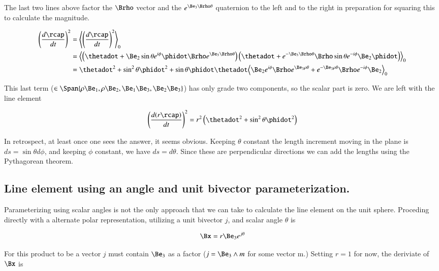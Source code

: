 The last two lines above factor the $\Brho$ vector and the $e^{\Be_3 \Brho \theta}$ quaternion to the left and to the right in preparation for squaring this to calculate the magnitude.

\begin{align*}
\left( \frac{d\rcap}{dt} \right)^2
&=
\gpgradezero{ \left( \frac{d\rcap}{dt} \right)^2 } \\
&=
\gpgradezero{ 
\left( \thetadot + \Be_2 \sin\theta e^{i\phi} \phidot \Brho e^{\Be_3 \Brho \theta} \right) 
\left(\thetadot + e^{-\Be_3 \Brho \theta} \Brho \sin\theta e^{-i\phi} \Be_2 \phidot\right) } \\
&=
\thetadot^2 + \sin^2\theta \phidot^2
+ \sin\theta \phidot \thetadot
\gpgradezero{ 
\Be_2 e^{i\phi} \Brho e^{\Be_3 \rho \theta}
+e^{-\Be_3 \rho \theta} \Brho e^{-i\phi} \Be_2
} \\
\end{align*}

This last term ($\in \Span \{\rho\Be_1, \rho\Be_2, \Be_1\Be_3, \Be_2\Be_3\}$) has only grade two components, so the scalar part is zero.  We are left with the line element 

\begin{align}\label{eqn:sphericalPolarUnit:yoo4}
\left(\frac{d (r\rcap)}{dt}\right)^2 = r^2 \left( \thetadot^2 + \sin^2\theta \phidot^2 \right)
\end{align}

In retrospect, at least once one sees the answer, it seems obvious.  Keeping $\theta$ constant the length increment moving in the plane is $ds = \sin\theta d\phi$, and keeping $\phi$ constant, we have $ds = d\theta$.  Since these are perpendicular directions we can add the lengths using the Pythagorean theorem.

\subsection{Line element using an angle and unit bivector parameterization.}

Parameterizing using scalar angles is not the only approach that we can take to calculate the line element on the unit sphere.  Proceding directly with a alternate polar representation, utilizing a unit bivector $j$, and scalar angle $\theta$ is

\begin{align}\label{eqn:sphericalPolarUnit:zoo1}
\Bx = r \Be_3 e^{j\theta}
\end{align}

For this product to be a vector $j$ must contain $\Be_3$ as a factor ($j = \Be_3 \wedge m$ for some vector m.)  Setting $r = 1$ for now, the deriviate of $\Bx$ is

